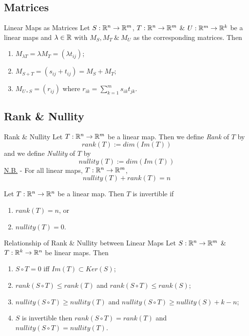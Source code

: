 \documentclass[11pt,a4paper]{article}
\begin{document}
\subsection{Matrices}

\subtitle{Definition 5.09 - }{Linear Maps as Matrices}
Let $S : \mathbb{R}^n \to \mathbb{R}^m$, $T : \mathbb{R}^n \to \mathbb{R}^m$ \& $U : \mathbb{R}^m \to \mathbb{R}^k$ be a linear maps and $\lambda \in \mathbb{R}$ with $M_S, M_T\ \&\ M_U$ as the corresponding matrices. Then
\begin{enumerate}[label=\roman*)]
  \item $M_{\lambda T} = \lambda M_T = (\lambda t_{ij})$;
  \item $M_{S + T} = (s_{ij} + t_{ij}) = M_S + M_T$;
  \item $M_{U \circ S} = (r_{ij})$ where $r_{ik} = \sum_{k=1}^m s_{ik}t_{jk}$.
\end{enumerate}

\subsection{Rank \& Nullity}

\subtitle{Defintion 5.10 - }{Rank \& Nullity}
Let $T : \mathbb{R}^n \to \mathbb{R}^m$ be a linear map. Then we define \textit{Rank} of $T$ by $$rank(T) := dim(Im(T))$$
and we define \textit{Nullity} of $T$ by $$nullity(T) := dim(Im(T))$$
\underline{N.B.} - For all linear maps, $T : \mathbb{R}^n \to \mathbb{R}^m$, $$nullity(T) + rank(T) = n$$

\subtitle{Remark 5.11}{}
Let $T : \mathbb{R}^n \to \mathbb{R}^n$ be a linear map. Then $T$ is invertible if
\begin{enumerate}[label=\roman*)]
  \item $rank(T) = n$, or
  \item $nullity(T) = 0$.
\end{enumerate}

\subtitle{Theorem 5.12 - }{Relationship of Rank \& Nullity between Linear Maps}
Let $S : \mathbb{R}^n \to \mathbb{R}^m$ \& $T : \mathbb{R}^k \to \mathbb{R}^n$ be linear maps. Then
\begin{enumerate}[label=\roman*)]
  \item $S \circ T = 0$ iff $Im(T) \subset Ker(S)$;
  \item $rank(S \circ T) \leq rank(T)$ and $rank(S \circ T) \leq rank(S)$;
  \item $nullity(S \circ T) \geq nullity(T)$ and $nullity(S \circ T) \geq nullity(S) + k - n$;
  \item $S$ is invertible then $rank(S \circ T) = rank(T)$ and $nullity(S \circ T) = nullity(T)$.
\end{enumerate}
\end{document}
